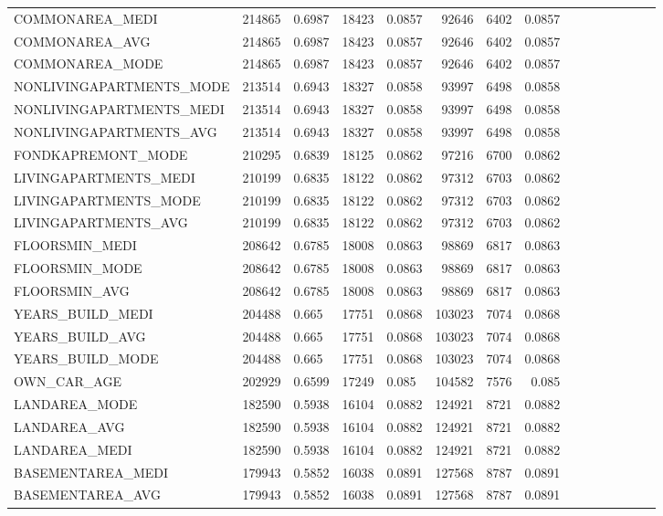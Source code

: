 \documentclass[12pt, letterpaper]{article}
\begin{document}
\begin{appendices}
{\begin{longtable}[c]{| l || Rm{1.3cm} | Rm{1.3cm} | Rm{1.3cm} | Rm{1.3cm} | Rm{1.3cm} | Rm{1.3cm} | Rm{1.3cm} |}
 COMMONAREA_MEDI	&	214865	&	0.6987	&	18423	&	0.0857	&	92646	&	6402	&	0.0857	\\
COMMONAREA_AVG	&	214865	&	0.6987	&	18423	&	0.0857	&	92646	&	6402	&	0.0857	\\
COMMONAREA_MODE	&	214865	&	0.6987	&	18423	&	0.0857	&	92646	&	6402	&	0.0857	\\
NONLIVINGAPARTMENTS_MODE	&	213514	&	0.6943	&	18327	&	0.0858	&	93997	&	6498	&	0.0858	\\
NONLIVINGAPARTMENTS_MEDI	&	213514	&	0.6943	&	18327	&	0.0858	&	93997	&	6498	&	0.0858	\\
NONLIVINGAPARTMENTS_AVG	&	213514	&	0.6943	&	18327	&	0.0858	&	93997	&	6498	&	0.0858	\\
FONDKAPREMONT_MODE	&	210295	&	0.6839	&	18125	&	0.0862	&	97216	&	6700	&	0.0862	\\
LIVINGAPARTMENTS_MEDI	&	210199	&	0.6835	&	18122	&	0.0862	&	97312	&	6703	&	0.0862	\\
LIVINGAPARTMENTS_MODE	&	210199	&	0.6835	&	18122	&	0.0862	&	97312	&	6703	&	0.0862	\\
LIVINGAPARTMENTS_AVG	&	210199	&	0.6835	&	18122	&	0.0862	&	97312	&	6703	&	0.0862	\\
FLOORSMIN_MEDI	&	208642	&	0.6785	&	18008	&	0.0863	&	98869	&	6817	&	0.0863	\\
FLOORSMIN_MODE	&	208642	&	0.6785	&	18008	&	0.0863	&	98869	&	6817	&	0.0863	\\
FLOORSMIN_AVG	&	208642	&	0.6785	&	18008	&	0.0863	&	98869	&	6817	&	0.0863	\\
YEARS_BUILD_MEDI	&	204488	&	0.665	&	17751	&	0.0868	&	103023	&	7074	&	0.0868	\\
YEARS_BUILD_AVG	&	204488	&	0.665	&	17751	&	0.0868	&	103023	&	7074	&	0.0868	\\
YEARS_BUILD_MODE	&	204488	&	0.665	&	17751	&	0.0868	&	103023	&	7074	&	0.0868	\\
OWN_CAR_AGE	&	202929	&	0.6599	&	17249	&	0.085	&	104582	&	7576	&	0.085	\\
LANDAREA_MODE	&	182590	&	0.5938	&	16104	&	0.0882	&	124921	&	8721	&	0.0882	\\
LANDAREA_AVG	&	182590	&	0.5938	&	16104	&	0.0882	&	124921	&	8721	&	0.0882	\\
LANDAREA_MEDI	&	182590	&	0.5938	&	16104	&	0.0882	&	124921	&	8721	&	0.0882	\\
BASEMENTAREA_MEDI	&	179943	&	0.5852	&	16038	&	0.0891	&	127568	&	8787	&	0.0891	\\
BASEMENTAREA_AVG	&	179943	&	0.5852	&	16038	&	0.0891	&	127568	&	8787	&	0.0891	\\

\end{longtable}}
\end{appendices}
\end{document}

